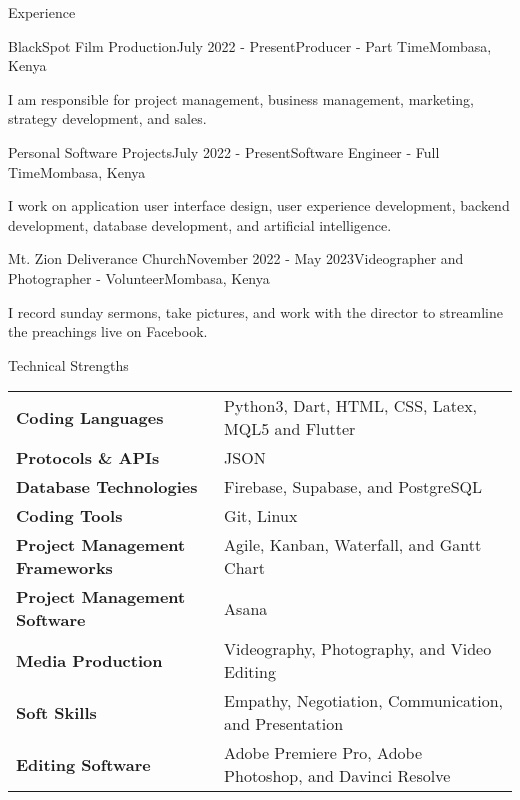 \documentclass[
	11pt, %
]{resume} %
\begin{document}
\begin{rSection}{Experience}
	\begin{rSubsection}{BlackSpot Film Production}{July 2022 - Present}{Producer - Part Time}{Mombasa, Kenya}
		\item I am responsible for project management, business management, marketing, strategy development, and sales. 
	\end{rSubsection}
	\begin{rSubsection}{Personal Software Projects}{July 2022 - Present}{Software Engineer - Full Time}{Mombasa, Kenya}
		\item I work on application user interface design, user experience development, backend development, database development, and artificial intelligence.
	\end{rSubsection}
	\begin{rSubsection}{Mt. Zion Deliverance Church}{November 2022 - May 2023}{Videographer and Photographer - Volunteer}{Mombasa, Kenya}
		\item I record sunday sermons, take pictures, and work with the director to streamline the preachings live on Facebook.
	\end{rSubsection}
\end{rSection}

\begin{rSection}{Technical Strengths}

	\begin{tabular}{@{} >{\bfseries}l @{\hspace{6ex}} l @{}}
		Coding Languages & Python3, Dart, HTML, CSS, Latex, MQL5 and Flutter \\
		Protocols \& APIs & JSON \\
		Database Technologies &  Firebase, Supabase, and PostgreSQL\\
		Coding Tools & Git, Linux \\
		Project Management Frameworks & Agile, Kanban, Waterfall, and Gantt Chart \\
		Project Management Software & Asana \\
		Media Production & Videography, Photography, and Video Editing \\
		Soft Skills & Empathy, Negotiation, Communication, and Presentation \\
		Editing Software & Adobe Premiere Pro, Adobe Photoshop, and Davinci Resolve \\
	\end{tabular}

\end{rSection}
\end{document}
